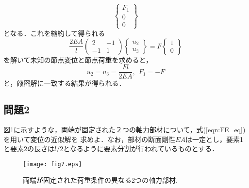 \documentclass[10pt,a4j]{jarticle}
\begin{document}
\begin{enumerate}
\begin{equation}
	\left\{
	\begin{array}{c}
		F_1 \\
		0  \\
		0  
	\end{array}
	\right\}
	\label{eqn:FE_eq_ex2}
\end{equation}
となる．これを縮約して得られる
\begin{equation}
	\frac{2EA}{l}
	\left(
	\begin{array}{cc}
		2 & -1  \\
		-1 & 1 
	\end{array}
	\right)
	\left\{
	\begin{array}{c}
		u_2 \\
		u_3
	\end{array}
	\right\}
	=
	F
	\left\{
	\begin{array}{c}
		1 \\
		0 
	\end{array}
	\right\} 
	\label{eqn:}
\end{equation}
を解いて未知の節点変位と節点荷重を求めると，
\begin{equation}
	u_2=u_3=\frac{Fl}{2EA}, \ \ F_1=-F
	\label{eqn:sol_ex2}
\end{equation}
と，厳密解に一致する結果が得られる．
\end{enumerate}
\subsection{問題2}
図\ref{fig:fig7}に示すような，両端が固定された２つの軸力部材について，式(\ref{eqn:FE_eq})を用いて変位の近似解を
求めよ．なお，部材の断面剛性$EA$は一定とし，要素1と要素2の長さは$l/2$となるように要素分割が行われているものとする．
\begin{figure}[h]
	\begin{center}
	\texttt{[image: fig7.eps]} 
	\end{center}
	\caption{両端が固定された荷重条件の異なる2つの軸力部材.} 
	\label{fig:fig7}
\end{figure}
\end{document}

